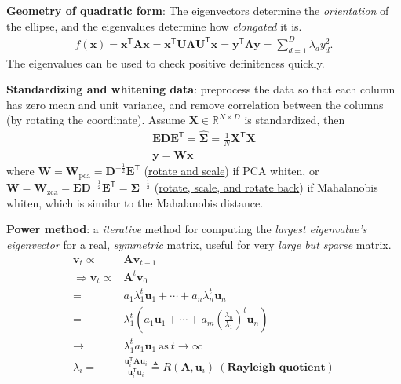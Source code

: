 \begin{example}
    \item \textbf{Geometry of quadratic form}: The eigenvectors determine
    the \textit{orientation} of the ellipse, and the eigenvalues determine how \textit{elongated} it is.
    \begin{gather}
        f(\bm{x})=\bm{x}^\mathsf{T}\mathbf{A}\bm{x}=\bm{x}^\mathsf{T}\mathbf{U\Lambda U}^\mathsf{T}\bm{x}
        =\bm{y}^\mathsf{T}\mathbf{\Lambda}\bm{y}=\sum_{d=1}^D \lambda_d y_d^2.
    \end{gather}
    The eigenvalues can be used to check positive definiteness quickly. 
\end{example}

\begin{example}
    \textbf{Standardizing and whitening data}: 
    preprocess the data so that each column has zero mean and unit variance, 
    and remove correlation between the columns (by rotating the coordinate).
    Assume $\mathbf{X}\in\mathbb{R}^{N\times D}$ is standardized,
    then 
    \begin{gather}
        \mathbf{EDE}^\mathsf{T}=\hat{\mathbf{\Sigma}}=\frac{1}{N}\mathbf{X}^\mathsf{T}\mathbf{X} \\
        \bm{y}=\mathbf{W}\bm{x}
    \end{gather}
    where $\mathbf{W}=\mathbf{W}_\text{pca}=\mathbf{D}^{-\frac{1}{2}}\mathbf{E}^\mathsf{T}$ (\uline{rotate and scale}) if PCA whiten, or
    $\mathbf{W}=\mathbf{W}_\text{zca}=\mathbf{E}\mathbf{D}^{-\frac{1}{2}}\mathbf{E}^\mathsf{T}=\mathbf{\Sigma}^{-\frac{1}{2}}$ (\uline{rotate, scale, and rotate back}) if Mahalanobis whiten,
    which is similar to the Mahalanobis distance.
\end{example}

\begin{example}
    \textbf{Power method}: a \textit{iterative} method for computing the \textit{largest eigenvalue's eigenvector} for a real, \textit{symmetric} matrix,
    useful for very \textit{large but sparse} matrix.
    \begin{align}
        \bm{v}_{t}\propto&\mathbf{A}\bm{v}_{t-1}\\
        \Rightarrow
        \bm{v}_{t}\propto&\mathbf{A}^t\bm{v}_0\\
        =& a_1\lambda_1^t\bm{u}_1+\cdots+a_n\lambda_n^t\bm{u}_n\\
        =& \lambda_1^t(a_1\bm{u}_1+\cdots+a_m(\frac{\lambda_n}{\lambda_1})^t\bm{u}_n)\\
        \to& \lambda_1^ta_1\bm{u}_1~\text{as}~t\to\infty\\
        \lambda_i=&\frac{\bm{u}_i^\mathsf{T}\mathbf{A}\bm{u}_i}{\bm{u}_i^\mathsf{T}\bm{u}_i}\triangleq R(\mathbf{A},\bm{u}_i)~(\textbf{Rayleigh quotient})
    \end{align}
\end{example}

